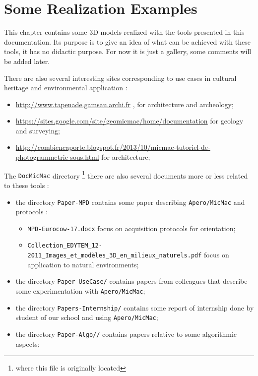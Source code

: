 \chapter{Some Realization Examples}


This chapter contains some 3D models realized with the tools presented
in this documentation. Its purpose is to give an idea of what can be achieved with these tools, 
it has no didactic purpose.  
For now it is just a gallery, some comments will be added later.

There are also several interesting sites corresponding to use
cases in cultural heritage and environmental application :

\begin{itemize}
   \item \url{http://www.tapenade.gamsau.archi.fr} , for architecture and 
         archeology;

   \item \url{https://sites.google.com/site/geomicmac/home/documentation}
         for geology and surveying;

   \item \url{ http://combiencaporte.blogspot.fr/2013/10/micmac-tutoriel-de-photogrammetrie-sous.html}
         for architecture;
\end{itemize}

The {\tt DocMicMac} directory \footnote{where this file  is originally located}
there are also several documents more or less related to these tools :

\begin{itemize}
   \item  the directory {\tt Paper-MPD} contains some paper describing {\tt Apero/MicMac}
          and protocols :

          \begin{itemize}
              \item {\tt MPD-Eurocow-17.docx} focus on acquisition protocols for orientation;
              \item {\tt Collection\_EDYTEM\_12-2011\_Images\_et\_modèles\_3D\_en\_milieux\_naturels.pdf} 
                    focus on application to natural environments;
          \end{itemize}

   \item  the directory {\tt Paper-UseCase/} contains papers from colleagues that describe some experimentation with {\tt Apero/MicMac};

   \item  the directory {\tt Papers-Internship/} contains some report of internship done
          by student of our school and using {\tt Apero/MicMac};

   \item  the directory {\tt Paper-Algo//} contains papers relative to some algorithmic aspects;
\end{itemize}

